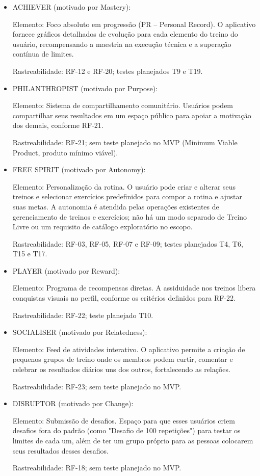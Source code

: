 \begin{itemize}
\item ACHIEVER (motivado por Mastery):

Elemento: Foco absoluto em progressão (PR -- Personal Record). O aplicativo fornece gráficos detalhados de evolução para cada elemento do treino do usuário, recompensando a maestria na execução técnica e a superação contínua de limites.

Rastreabilidade: RF-12 e RF-20; testes planejados T9 e T19.

\item PHILANTHROPIST (motivado por Purpose):

Elemento: Sistema de compartilhamento comunitário. Usuários podem compartilhar seus resultados em um espaço público para apoiar a motivação dos demais, conforme RF-21.

Rastreabilidade: RF-21; sem teste planejado no MVP (Minimum Viable Product, produto mínimo viável).

\item FREE SPIRIT (motivado por Autonomy):

Elemento: Personalização da rotina. O usuário pode criar e alterar seus treinos e selecionar exercícios predefinidos para compor a rotina e ajustar suas metas. A autonomia é atendida pelas operações existentes de gerenciamento de treinos e exercícios; não há um modo separado de Treino Livre ou um requisito de catálogo exploratório no escopo.

Rastreabilidade: RF-03, RF-05, RF-07 e RF-09; testes planejados T4, T6, T15 e T17.

\item PLAYER (motivado por Reward):

Elemento: Programa de recompensas diretas. A assiduidade nos treinos libera conquistas visuais no perfil, conforme os critérios definidos para RF-22.

Rastreabilidade: RF-22; teste planejado T10.

\item SOCIALISER (motivado por Relatedness):

Elemento: Feed de atividades interativo. O aplicativo permite a criação de pequenos grupos de treino onde os membros podem curtir, comentar e celebrar os resultados diários uns dos outros, fortalecendo as relações.

Rastreabilidade: RF-23; sem teste planejado no MVP.

\item DISRUPTOR (motivado por Change):

Elemento: Submissão de desafios. Espaço para que esses usuários criem desafios fora do padrão (como "Desafio de 100 repetições") para testar os limites de cada um, além de ter um grupo próprio para as pessoas colocarem seus resultados desses desafios.

Rastreabilidade: RF-18; sem teste planejado no MVP.

\end{itemize}

